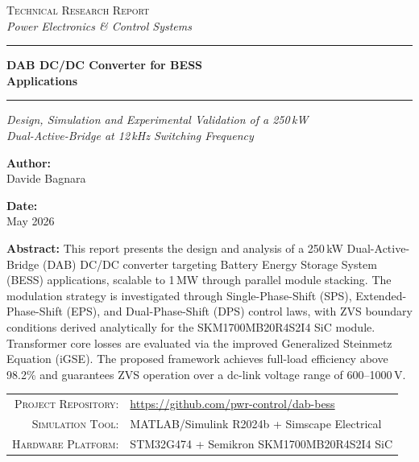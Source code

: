 \documentclass[12pt, a4paper]{article}
\newcommand{\DocCategory}{Technical Research Report}
\newcommand{\DocField}{Power Electronics \& Control Systems}
\newcommand{\DocTitle}{%
    DAB DC/DC Converter for BESS\\
    Applications
}
\newcommand{\DocSubtitle}{%
    Design, Simulation and Experimental Validation of a 250\,kW\\
    Dual-Active-Bridge at 12\,kHz Switching Frequency
}
\newcommand{\DocAuthor}{Davide Bagnara}
\newcommand{\DocDate}{May 2026}
\newcommand{\DocAbstract}{%
    This report presents the design and analysis of a 250\,kW
    Dual-Active-Bridge (DAB) DC/DC converter targeting Battery Energy
    Storage System (BESS) applications, scalable to 1\,MW through parallel
    module stacking. The modulation strategy is investigated through
    Single-Phase-Shift (SPS), Extended-Phase-Shift (EPS), and
    Dual-Phase-Shift (DPS) control laws, with ZVS boundary conditions
    derived analytically for the SKM1700MB20R4S2I4 SiC module.
    Transformer core losses are evaluated via the improved Generalized
    Steinmetz Equation (iGSE). The proposed framework achieves full-load
    efficiency above 98.2\% and guarantees ZVS operation over a dc-link
    voltage range of 600--1000\,V.
}
\newcommand{\MetaLabelA}{Project Repository}
\newcommand{\MetaValueA}{https://github.com/pwr-control/dab-bess}
\newcommand{\MetaLabelB}{Simulation Tool}
\newcommand{\MetaValueB}{MATLAB/Simulink R2024b + Simscape Electrical}
\newcommand{\MetaLabelC}{Hardware Platform}
\newcommand{\MetaValueC}{STM32G474 + Semikron SKM1700MB20R4S2I4 SiC}
\begin{document}
\begin{center}
    {\large\scshape \DocCategory}\\[4pt]
    {\small\itshape \DocField}
\end{center}

\vspace{10pt}
\noindent\rule{\linewidth}{0.8pt}

\vspace{28pt}
\begin{center}
    {\fontsize{22}{30}\selectfont\bfseries \DocTitle}
\end{center}

\vspace{4pt}
\noindent\rule{\linewidth}{0.8pt}

\vspace{14pt}
\begin{center}
    {\large\itshape \DocSubtitle}
\end{center}

\vspace{36pt}

\noindent
\begin{minipage}[t]{0.48\linewidth}
    \textbf{Author:}\\[2pt]
    \DocAuthor
\end{minipage}%
\hfill
\begin{minipage}[t]{0.48\linewidth}
    \raggedleft
    \textbf{Date:}\\[2pt]
    \DocDate
\end{minipage}

\vspace{36pt}

\begin{center}
\begin{minipage}{0.88\linewidth}
    \small
    \textbf{Abstract:} \DocAbstract
\end{minipage}
\end{center}

\vfill

\noindent
\begin{tabular}{@{} r @{\quad} l @{}}
    \textsc{\small\MetaLabelA:} & {\small\url{\MetaValueA}} \\[3pt]
    \textsc{\small\MetaLabelB:} & {\small\MetaValueB}       \\[3pt]
    \textsc{\small\MetaLabelC:} & {\small\MetaValueC}       \\
\end{tabular}

\newpage
{}
\setcounter{page}{1}

\end{document}
